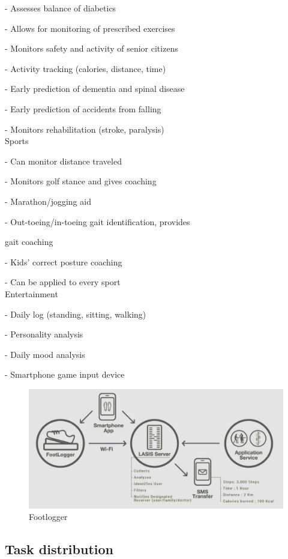 \documentclass[conference]{IEEEtran}
\begin{document}
- Assesses balance of diabetics

- Allows for monitoring of prescribed exercises 

- Monitors safety and activity of senior citizens

- Activity tracking (calories, distance, time)

- Early prediction of dementia and spinal disease

- Early prediction of accidents from falling

- Monitors rehabilitation (stroke, paralysis)\\

Sports

- Can monitor distance traveled

- Monitors golf stance and gives coaching

- Marathon/jogging aid

- Out-toeing/in-toeing gait identification, provides 

gait coaching
 
- Kids' correct posture coaching

- Can be applied to every sport\\

Entertainment

-  Daily log (standing, sitting, walking)

-  Personality analysis

-  Daily mood analysis

-  Smartphone game input device\\

\begin{figure}[H]
\begin{center}
    \includegraphics[scale=0.33]{img_05.jpg}
    \caption{Footlogger} 
\end{center}
\end{figure}

\subsection{Task distribution}
\end{document}
